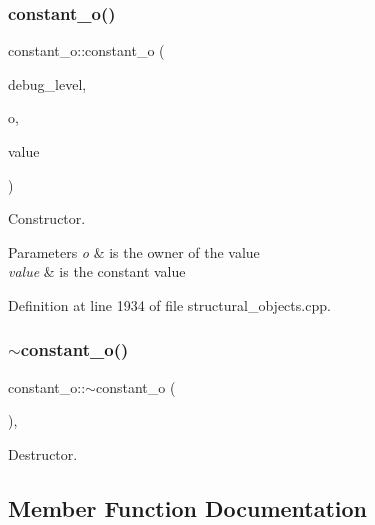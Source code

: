 \subsubsection{\texorpdfstring{constant\+\_\+o()}{constant\_o()}\hspace{0.1cm}{\footnotesize\ttfamily [2/2]}}
{\footnotesize\ttfamily constant\+\_\+o\+::constant\+\_\+o (\begin{DoxyParamCaption}\item[{int}]{debug\+\_\+level,  }\item[{const \hyperlink{structural__objects_8hpp_a8ea5f8cc50ab8f4c31e2751074ff60b2}{structural\+\_\+object\+Ref}}]{o,  }\item[{std\+::string}]{value }\end{DoxyParamCaption})}



Constructor. 


\begin{DoxyParams}{Parameters}
{\em o} & is the owner of the value \\
\hline
{\em value} & is the constant value \\
\hline
\end{DoxyParams}


Definition at line 1934 of file structural\+\_\+objects.\+cpp.

\mbox{\label{classconstant__o_a9625c9086f03abc554d21457c35c2938}} 
\subsubsection{\texorpdfstring{$\sim$constant\+\_\+o()}{~constant\_o()}}
{\footnotesize\ttfamily constant\+\_\+o\+::$\sim$constant\+\_\+o (\begin{DoxyParamCaption}{ }\end{DoxyParamCaption})\hspace{0.3cm}{\ttfamily [override]}, {\ttfamily [default]}}



Destructor. 



\subsection{Member Function Documentation}
\mbox{\label{classconstant__o_aceab3f419906801291e1ccfce63859e5}} 
